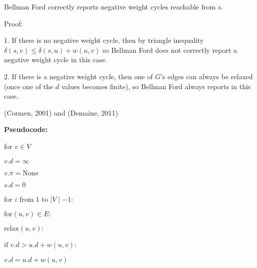 \documentclass{article}
\begin{document}
Bellman Ford correctly reports negative weight cycles reachable from $s$.

Proof:

1. If there is no negative weight cycle, then by triangle inequality $\delta(s,v) \leq \delta(s,u) + w(u,v)$ so Bellman Ford does not correctly report a negative weight cycle in this case.

2. If there is a negative weight cycle, then one of $G$'s edges can always be relaxed (once one of the $d$ values becomes finite), so Bellman Ford always reports in this case.

(Cormen, 2001) and (Demaine, 2011)

\textbf{Pseudocode:}

for $v \in V$

\hspace{5 pt}  $v.d = \infty$

\hspace{5 pt} $v.\pi = \text{None}$

$s.d = 0$

$\text{for}$ \hspace{0.5 pt} $i$ \hspace{0.5 pt} $\text{from}$ \hspace{0.5 pt} $1$ \hspace{0.5 pt} $\text{to}$ \hspace{0.5 pt} $\mid V \mid -1:$

\hspace{5 pt}\hspace{5 pt}\hspace{5 pt}$\text{for} (u,v) \in E:$
 
\hspace{5 pt}\hspace{5 pt}\hspace{5 pt}\hspace{5 pt}$\text{relax}(u,v):$
  
\hspace{5 pt}\hspace{5 pt}\hspace{5 pt}\hspace{5 pt}\hspace{5 pt}$\text{if}$ \hspace{1 pt} $v.d > u.d + w(u,v):$
   
\hspace{5 pt}\hspace{5 pt}\hspace{5 pt}\hspace{5 pt}\hspace{5 pt}\hspace{5 pt}$v.d = u.d + w(u,v)$
	
\end{document}
